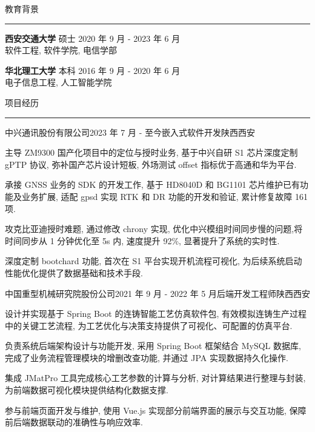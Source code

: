 \documentclass{cv} %
\renewenvironment{rSection}[1]{
\sectionskip
\textcolor{RoyalPurple}{\MakeUppercase{#1}}
\sectionlineskip
\hrule
\begin{list}{}{
\setlength{\leftmargin}{1.5em}
}
\item[]
}{
\end{list}
}
\begin{document}
\begin{rSection}{教育背景}
	{\bf 西安交通大学} 硕士 \hfill {2020 年 9 月 - 2023 年 6 月}
	\smallskip \\ 软件工程, 软件学院, 电信学部

	{\bf 华北理工大学} 本科 \hfill {2016 年 9 月 - 2020 年 6 月}
	\smallskip \\ 电子信息工程, 人工智能学院 \hfill
\end{rSection}

\begin{rSection}{项目经历}
	\begin{rSubsection}{中兴通讯股份有限公司}{2023 年 7 月 - 至今}{嵌入式软件开发}{陕西西安}
		\item 主导 ZM9300 国产化项目中的定位与授时业务, 基于中兴自研 S1 芯片深度定制 gPTP 协议, 弥补国产芯片设计短板, 外场测试 offset 指标优于高通和华为平台.
		\item 承接 GNSS 业务的 SDK 的开发工作, 基于 HD8040D 和 BG1101 芯片维护已有功能及业务扩展, 适配 gpsd 实现 RTK 和 DR 功能的开发和验证, 累计修复故障 161 项.
		\item 攻克比亚迪授时难题, 通过修改 chrony 实现, 优化中兴模组时间同步慢的问题,将时间同步从 1 分钟优化至 5s 内, 速度提升 92\%, 显著提升了系统的实时性.
		\item 深度定制 bootchard 功能, 首次在 S1 平台实现开机流程可视化, 为后续系统启动性能优化提供了数据基础和技术手段.
	\end{rSubsection}
	\begin{rSubsection}{中国重型机械研究院股份公司}{2021 年 9 月 - 2022 年 5 月}{后端开发工程师}{陕西西安}
		\item 设计并实现基于 Spring Boot 的连铸智能工艺仿真软件包, 有效模拟连铸生产过程中的关键工艺流程, 为工艺优化与决策支持提供了可视化、可配置的仿真平台.
		\item 负责系统后端架构设计与功能开发, 采用 Spring Boot 框架结合 MySQL 数据库, 完成了业务流程管理模块的增删改查功能, 并通过 JPA 实现数据持久化操作.
		\item 集成 JMatPro 工具完成核心工艺参数的计算与分析, 对计算结果进行整理与封装, 为前端数据可视化模块提供结构化数据支撑.
		\item 参与前端页面开发与维护, 使用 Vue.js 实现部分前端界面的展示与交互功能, 保障前后端数据联动的准确性与响应效率.
	\end{rSubsection}
\end{rSection}
\end{document}
